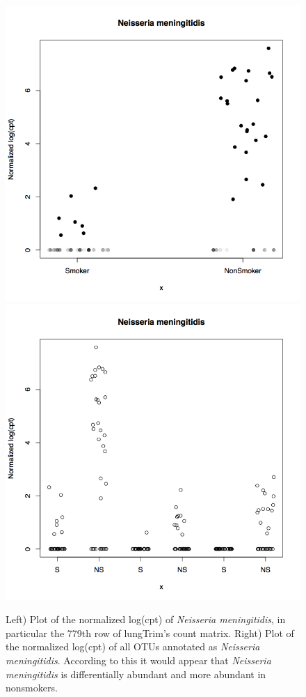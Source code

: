 \documentclass[a4paper,12pt]{article}
\begin{document}
\begin{small}
\begin{Schunk}
\end{Schunk}


\begin{figure}
\centerline{\includegraphics[width=.55\textwidth]{metagenomeSeq_figure5.png}\includegraphics[width=.55\textwidth]{metagenomeSeq_figure6.png}\label{fig4}}
\caption{Left) Plot of the normalized log(cpt) of \textit{Neisseria meningitidis}, in particular the 779th row of lungTrim's count matrix. Right) Plot of the normalized log(cpt) of all OTUs annotated as \textit{Neisseria meningitidis}. According to this it would appear that \textit{Neisseria meningitidis} is differentially abundant and more abundant in nonsmokers.}
\end{figure}

\end{small}
\end{document}

